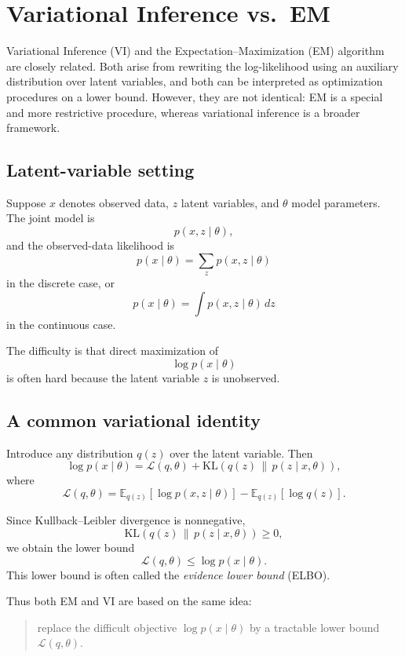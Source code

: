 \section{Variational Inference vs.\ EM}

Variational Inference (VI) and the Expectation--Maximization (EM) algorithm are closely related. Both arise from rewriting the log-likelihood using an auxiliary distribution over latent variables, and both can be interpreted as optimization procedures on a lower bound. However, they are not identical: EM is a special and more restrictive procedure, whereas variational inference is a broader framework.

\subsection{Latent-variable setting}

Suppose \(x\) denotes observed data, \(z\) latent variables, and \(\theta\) model parameters. The joint model is
\[
p(x,z \mid \theta),
\]
and the observed-data likelihood is
\[
p(x\mid \theta)=\sum_z p(x,z\mid \theta)
\]
in the discrete case, or
\[
p(x\mid \theta)=\int p(x,z\mid \theta)\,dz
\]
in the continuous case.

The difficulty is that direct maximization of
\[
\log p(x\mid \theta)
\]
is often hard because the latent variable \(z\) is unobserved.

\subsection{A common variational identity}

Introduce any distribution \(q(z)\) over the latent variable. Then
\[
\log p(x\mid \theta)
=
\mathcal{L}(q,\theta)
+
\mathrm{KL}\!\left(q(z)\,\|\,p(z\mid x,\theta)\right),
\]
where
\[
\mathcal{L}(q,\theta)
=
\mathbb{E}_{q(z)}[\log p(x,z\mid \theta)]
-
\mathbb{E}_{q(z)}[\log q(z)].
\]

Since Kullback--Leibler divergence is nonnegative,
\[
\mathrm{KL}\!\left(q(z)\,\|\,p(z\mid x,\theta)\right)\ge 0,
\]
we obtain the lower bound
\[
\mathcal{L}(q,\theta)\le \log p(x\mid \theta).
\]
This lower bound is often called the \emph{evidence lower bound} (ELBO).

Thus both EM and VI are based on the same idea:
\begin{quote}
replace the difficult objective \(\log p(x\mid \theta)\) by a tractable lower bound \(\mathcal{L}(q,\theta)\).
\end{quote}

